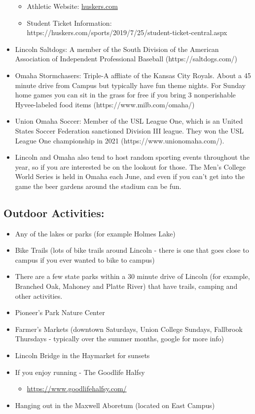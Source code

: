 \documentclass[
  12pt,
]{book}
\providecommand{\tightlist}{%
  \setlength{\itemsep}{0pt}\setlength{\parskip}{0pt}}
\begin{document}
\begin{itemize}
\begin{itemize}
\item Athletic Website: \href{https://huskers.com}{huskers.com}
\item Student Ticket Information: https://huskers.com/sports/2019/7/25/student-ticket-central.aspx
\end{itemize}
\item Lincoln Saltdogs: A member of the South Division of the American Association of Independent Professional Baseball (https://saltdogs.com/)
\item Omaha Stormchasers: Triple-A affliate of the Kansas City Royals. About a 45 minute drive from Campus but typically have fun theme nights. For Sunday home games you can sit in the grass for free if you bring 3 nonperishable Hyvee-labeled food items (https://www.milb.com/omaha/)
\item Union Omaha Soccer: Member of the USL League One, which is an United States Soccer Federation sanctioned Division III league. They won the USL League One championship in 2021 (https://www.unionomaha.com/).
\item Lincoln and Omaha also tend to host random sporting events throughout the year, so if you are interested be on the lookout for those. The Men's College World Series is held in Omaha each June, and even if you can't get into the game the beer gardens around the stadium can be fun. 
\end{itemize}

\hypertarget{outdoor-activities}{%
\subsection{Outdoor Activities:}\label{outdoor-activities}}

\begin{itemize}
\tightlist
\item
  Any of the lakes or parks (for example Holmes Lake)
\item
  Bike Trails (lots of bike trails around Lincoln - there is one that goes close to campus if you ever wanted to bike to campus)
\item
  There are a few state parks within a 30 minute drive of Lincoln (for example, Branched Oak, Mahoney and Platte River) that have trails, camping and other activities.
\item
  Pioneer's Park Nature Center
\item
  Farmer's Markets (downtown Saturdays, Union College Sundays, Fallbrook Thursdays - typically over the summer months, google for more info)
\item
  Lincoln Bridge in the Haymarket for sunsets
\item
  If you enjoy running - The Goodlife Halfsy

  \begin{itemize}
  \tightlist
  \item
    \url{https://www.goodlifehalfsy.com/}
  \end{itemize}
\item
  Hanging out in the Maxwell Aboretum (located on East Campus)
\end{itemize}
\end{document}

